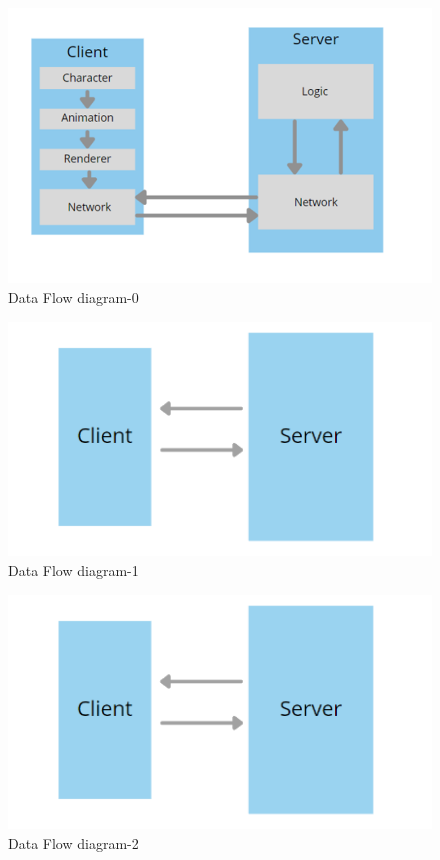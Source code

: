 \documentclass[12pt]{report}
\begin{document}
\vspace{1cm}
\begin{figure}[h]
\centering
\includegraphics[scale=0.7]{ Data Flow diagram-0.png}
\caption{ Data Flow diagram-0}
\label{ Data Flow diagram-0}
\end{figure}


\vspace{1cm}
\begin{figure}[h]
\centering
\includegraphics[scale=0.8]{ Data Flow diagram-1.png}
\caption{ Data Flow diagram-1}
\label{ Data Flow diagram-1}
\end{figure}



\vspace{1.5cm}
\begin{figure}[h]
\centering
\includegraphics[scale=1.0]{ Data Flow diagram-1.png}
\caption{ Data Flow diagram-2}
\label{ Data Flow diagram-2}
\end{figure}
\end{document}
